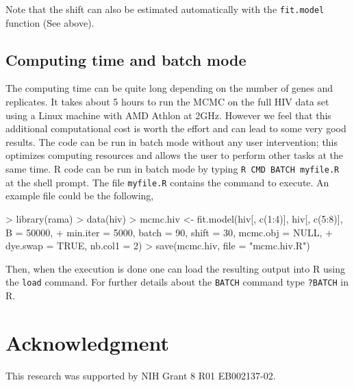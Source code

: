 \documentclass[11pt]{article}
\begin{document}
Note that the shift can also be estimated automatically with the {\tt fit.model} function (See above).

\subsection{Computing time and batch mode}

The computing time can be quite long depending on the number of genes and replicates. 
It takes about 5 hours to run the MCMC on the full HIV data set using a Linux machine with AMD Athlon at 2GHz. 
However we feel that this additional computational cost is 
worth the effort and can lead to some very good results. 
The code can be run in batch mode without any user intervention; this optimizes 
computing resources and allows the user to perform other tasks at the same time. 
R code can be run in batch mode by typing {\tt R CMD BATCH myfile.R} 
at the shell prompt. The file {\tt myfile.R} contains the command to execute.
An example file could be the following,
\begin{Schunk}
\begin{Sinput}
> library(rama)
> data(hiv)
> mcmc.hiv <- fit.model(hiv[, c(1:4)], hiv[, c(5:8)], B = 50000, 
+     min.iter = 5000, batch = 90, shift = 30, mcmc.obj = NULL, 
+     dye.swap = TRUE, nb.col1 = 2)
> save(mcmc.hiv, file = "mcmc.hiv.R")
\end{Sinput}
\end{Schunk}
Then, when the execution is done one can load the resulting output into R using the {\tt load} command. For further details about the {\tt BATCH} command type {\tt ?BATCH} in R.\\

\section{Acknowledgment}
This research was supported by NIH Grant 8 R01 EB002137-02.



 

\end{document}
